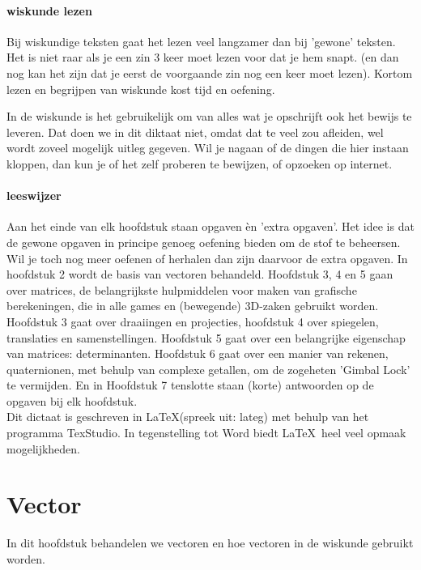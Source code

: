 \documentclass[hidelinks, a4wide, 12pt,  twoside]{book}
\begin{document}
\subsubsection{wiskunde lezen}
Bij wiskundige teksten gaat het lezen veel langzamer  dan bij 'gewone' teksten. Het is niet raar als je een zin 3 keer moet lezen voor dat je hem snapt. (en dan nog kan het zijn dat je eerst de voorgaande zin nog een keer moet lezen). Kortom lezen en begrijpen van wiskunde kost tijd en oefening.

In de wiskunde is het gebruikelijk om van alles wat je opschrijft ook het bewijs te leveren. Dat doen we in dit diktaat niet, omdat dat te veel zou afleiden, wel wordt zoveel mogelijk uitleg gegeven. Wil je nagaan of de dingen die hier instaan kloppen, dan kun je of het zelf proberen te bewijzen, of opzoeken op internet.

\subsubsection {leeswijzer}
Aan het einde van elk hoofdstuk staan opgaven èn 'extra opgaven'. Het idee is dat de gewone opgaven in principe genoeg oefening bieden om de stof te beheersen. Wil je toch nog meer oefenen of herhalen dan zijn daarvoor de extra opgaven. In hoofdstuk 2 wordt de basis van vectoren behandeld. Hoofdstuk 3, 4 en 5 gaan over matrices, de belangrijkste hulpmiddelen voor maken van grafische berekeningen, die in alle games en (bewegende) 3D-zaken gebruikt worden. Hoofdstuk 3 gaat over draaiingen en projecties, hoofdstuk 4 over spiegelen, translaties en samenstellingen. Hoofdstuk 5 gaat over een belangrijke eigenschap van matrices: determinanten. Hoofdstuk 6 gaat over een manier van rekenen, quaternionen, met behulp van complexe getallen, om de zogeheten 'Gimbal Lock' te vermijden. En in Hoofdstuk 7 tenslotte staan (korte) antwoorden op de opgaven bij elk hoofdstuk. \\
Dit dictaat is geschreven in \LaTeX   \quad(spreek uit: lateg) met behulp van het programma TexStudio. In tegenstelling tot Word biedt  \LaTeX \   heel veel opmaak mogelijkheden.



\chapter{Vector}
\label{chap:vectoren}
In dit hoofdstuk behandelen we vectoren en hoe vectoren in de wiskunde gebruikt worden.\\ \\
\end{document}

